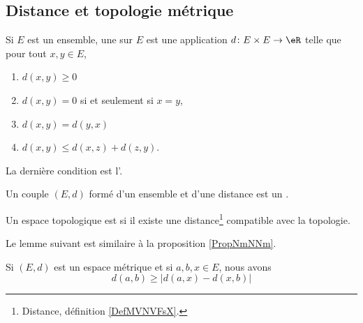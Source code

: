 \subsection{Distance et topologie métrique}

\begin{definition}  \label{DefMVNVFsX}
	Si \( E\) est un ensemble, une  sur \( E\) est une application \( d\colon E\times E\to \eR\) telle que pour tout \( x,y\in E\),
	\begin{enumerate}

		\item
		      \( d(x,y)\geq 0\)

		\item
		      \( d(x,y)=0\) si et seulement si \( x=y\),

		\item
		      \( d(x,y)=d(y,x)\)

		\item
		      \( d(x,y)\leq d(x,z)+d(z,y)\).

	\end{enumerate}
	La dernière condition est l'.

	Un couple \( (E,d)\) formé d'un ensemble et d'une distance est un .
\end{definition}


\begin{definition}		\label{DEFooGLTUooJjaSmI}
	Un espace topologique est  si il existe une distance\footnote{Distance, définition \ref{DefMVNVFsX}.} compatible avec la topologie.
\end{definition}


Le lemme suivant est similaire à la proposition \ref{PropNmNNm}.
\begin{lemma}		\label{LEMooXCXHooVtrkvl}
	Si \( (E,d)\) est un espace métrique et si \( a,b,x\in E\), nous avons
	\begin{equation}
		d(a,b)\geq \big| d(a,x)-d(x,b) \big|
	\end{equation}
\end{lemma}


